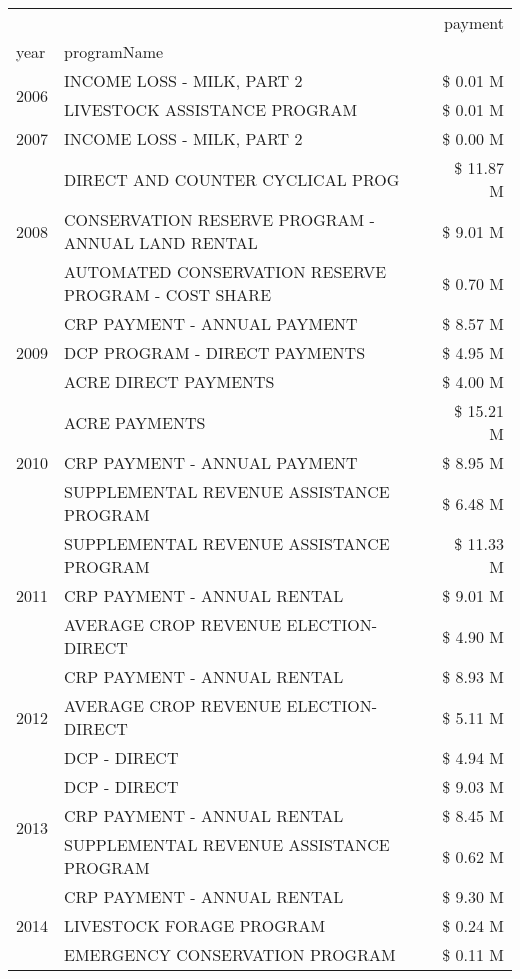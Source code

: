 \begin{tabular}{llr}
\toprule
 &  & payment \\
year & programName &  \\
\midrule
\multirow[t]{2}{*}{2006} & INCOME LOSS - MILK, PART 2 & \$ 0.01 M \\
 & LIVESTOCK ASSISTANCE PROGRAM & \$ 0.01 M \\
\cline{1-3}
2007 & INCOME LOSS - MILK, PART 2 & \$ 0.00 M \\
\cline{1-3}
\multirow[t]{3}{*}{2008} & DIRECT AND COUNTER CYCLICAL PROG & \$ 11.87 M \\
 & CONSERVATION RESERVE PROGRAM - ANNUAL LAND RENTAL & \$ 9.01 M \\
 & AUTOMATED CONSERVATION RESERVE PROGRAM - COST SHARE & \$ 0.70 M \\
\cline{1-3}
\multirow[t]{3}{*}{2009} & CRP PAYMENT - ANNUAL PAYMENT & \$ 8.57 M \\
 & DCP PROGRAM - DIRECT PAYMENTS & \$ 4.95 M \\
 & ACRE DIRECT PAYMENTS & \$ 4.00 M \\
\cline{1-3}
\multirow[t]{3}{*}{2010} & ACRE PAYMENTS & \$ 15.21 M \\
 & CRP PAYMENT - ANNUAL PAYMENT & \$ 8.95 M \\
 & SUPPLEMENTAL REVENUE ASSISTANCE PROGRAM & \$ 6.48 M \\
\cline{1-3}
\multirow[t]{3}{*}{2011} & SUPPLEMENTAL REVENUE ASSISTANCE PROGRAM & \$ 11.33 M \\
 & CRP PAYMENT - ANNUAL RENTAL & \$ 9.01 M \\
 & AVERAGE CROP REVENUE ELECTION-DIRECT & \$ 4.90 M \\
\cline{1-3}
\multirow[t]{3}{*}{2012} & CRP PAYMENT - ANNUAL RENTAL & \$ 8.93 M \\
 & AVERAGE CROP REVENUE ELECTION-DIRECT & \$ 5.11 M \\
 & DCP - DIRECT & \$ 4.94 M \\
\cline{1-3}
\multirow[t]{3}{*}{2013} & DCP - DIRECT & \$ 9.03 M \\
 & CRP PAYMENT - ANNUAL RENTAL & \$ 8.45 M \\
 & SUPPLEMENTAL REVENUE ASSISTANCE PROGRAM & \$ 0.62 M \\
\cline{1-3}
\multirow[t]{3}{*}{2014} & CRP PAYMENT - ANNUAL RENTAL & \$ 9.30 M \\
 & LIVESTOCK FORAGE PROGRAM & \$ 0.24 M \\
 & EMERGENCY CONSERVATION PROGRAM & \$ 0.11 M \\

\end{tabular}
